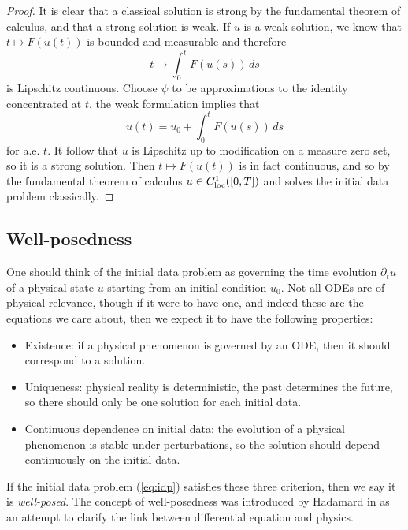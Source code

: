 \begin{proof}
	 It is clear that a classical solution is strong by the fundamental theorem of calculus, and that a strong solution is weak. If $u$ is a weak solution, we know that $t \mapsto F(u(t))$ is bounded and measurable and therefore
	\[ t \mapsto \int_0^t F(u(s)) \, ds \]
is Lipschitz continuous. Choose $\psi$ to be approximations to the identity concentrated at $t$, the weak formulation implies that
	\[ u(t) = u_0 + \int_0^t F(u(s)) \, ds \]
for a.e. $t$. It follow that $u$ is Lipschitz up to modification on a measure zero set, so it is a strong solution. Then $t \mapsto F(u(t))$ is in fact continuous, and so by the fundamental theorem of calculus $u \in C^1_{\mathrm{loc}} ([0, T])$ and solves the initial data problem classically. 
\end{proof}


\subsection{Well-posedness}

One should think of the initial data problem as governing the time evolution $\partial_t u$ of a physical state $u$ starting from an initial condition $u_0$. Not all ODEs are of physical relevance, though if it were to have one, and indeed these are the equations we care about, then we expect it to have the following properties:
	\begin{itemize}
		\item Existence: if a physical phenomenon is governed by an ODE, then it should correspond to a solution. 
		
		\item Uniqueness: physical reality is deterministic, the past determines the future, so there should only be one solution for each initial data. 
		
		\item Continuous dependence on initial data: the evolution of a physical phenomenon is stable under perturbations, so the solution should depend continuously on the initial data. 
	\end{itemize}
If the initial data problem (\ref{eq:idp}) satisfies these three criterion, then we say it is \emph{well-posed}. The concept of well-posedness was introduced by Hadamard in \cite{hadamard} as an attempt to clarify the link between differential equation and physics. 

